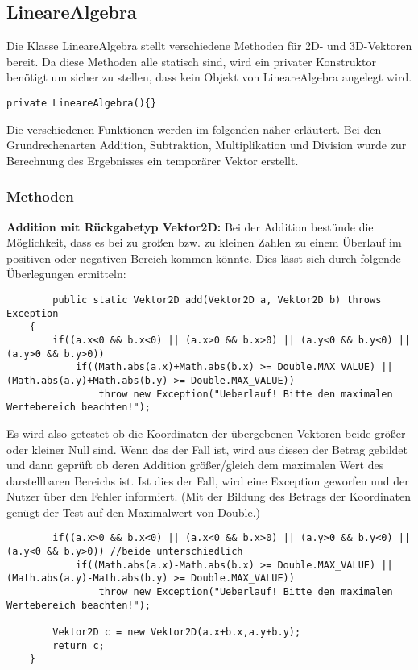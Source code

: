 \documentclass[a4paper,11pt]{scrartcl}
\begin{document}
\subsection{LineareAlgebra}
Die Klasse LineareAlgebra stellt verschiedene Methoden für 2D- und 3D-Vektoren bereit. Da diese Methoden alle statisch sind, wird ein privater Konstruktor benötigt um sicher zu stellen, dass kein Objekt von LineareAlgebra angelegt wird. 
\begin{lstlisting}
private LineareAlgebra(){}
\end{lstlisting}
Die verschiedenen Funktionen werden im folgenden näher erläutert.
Bei den Grundrechenarten Addition, Subtraktion, Multiplikation und Division wurde zur Berechnung des Ergebnisses ein temporärer Vektor erstellt.
\subsubsection{Methoden}
\textbf{Addition mit Rückgabetyp Vektor2D:}  Bei der Addition bestünde die Möglichkeit, dass es bei zu großen bzw. zu kleinen Zahlen zu einem Überlauf im positiven oder negativen Bereich kommen könnte. Dies lässt sich durch folgende Überlegungen ermitteln:
\begin{lstlisting}
		public static Vektor2D add(Vektor2D a, Vektor2D b) throws Exception
	{
		if((a.x<0 && b.x<0) || (a.x>0 && b.x>0) || (a.y<0 && b.y<0) || (a.y>0 && b.y>0))
			if((Math.abs(a.x)+Math.abs(b.x) >= Double.MAX_VALUE) || (Math.abs(a.y)+Math.abs(b.y) >= Double.MAX_VALUE))
				throw new Exception("Ueberlauf! Bitte den maximalen Wertebereich beachten!");

\end{lstlisting}
Es wird also getestet ob die Koordinaten der übergebenen Vektoren beide größer oder kleiner Null sind. Wenn das der Fall ist, wird aus diesen der Betrag gebildet und dann geprüft ob deren Addition größer/gleich dem maximalen Wert des darstellbaren Bereichs ist. Ist dies der Fall, wird eine Exception geworfen und der Nutzer über den Fehler informiert.
(Mit der Bildung des Betrags der Koordinaten genügt der Test auf den Maximalwert von Double.)
\begin{lstlisting}		
		if((a.x>0 && b.x<0) || (a.x<0 && b.x>0) || (a.y>0 && b.y<0) || (a.y<0 && b.y>0)) //beide unterschiedlich
			if((Math.abs(a.x)-Math.abs(b.x) >= Double.MAX_VALUE) || (Math.abs(a.y)-Math.abs(b.y) >= Double.MAX_VALUE))
				throw new Exception("Ueberlauf! Bitte den maximalen Wertebereich beachten!");
		
		Vektor2D c = new Vektor2D(a.x+b.x,a.y+b.y);
		return c;
	}
\end{lstlisting}
\end{document}
